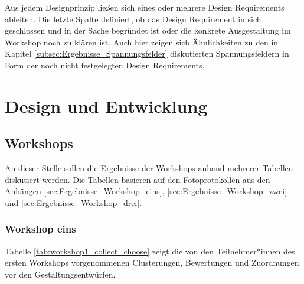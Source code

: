 Aus jedem Designprinzip ließen sich eines oder mehrere Design Requirements ableiten. Die letzte Spalte definiert, ob das Design Requirement in sich geschlossen und in der Sache begründet ist oder die konkrete Ausgestaltung im Workshop noch zu klären ist. Auch hier zeigen sich Ähnlichkeiten zu den in Kapitel \ref{subsec:Ergebnisse_Spannungsfelder} diskutierten Spannungsfeldern in Form der noch nicht festgelegten Design Requirements. 

\section{Design und Entwicklung}
\label{sec:Ergebnisse_Phase_drei}

\subsection{Workshops}
\label{subsec:Ergebnisse_Workshops}

An dieser Stelle sollen die Ergebnisse der Workshops anhand mehrerer Tabellen diskutiert werden. Die Tabellen basieren auf den Fotoprotokollen aus den Anhängen \ref{sec:Ergebnisse_Workshop_eins}, \ref{sec:Ergebnisse_Workshop_zwei} und \ref{sec:Ergebnisse_Workshop_drei}.

\subsubsection{Workshop eins}
\label{subsubsec:Ergebnisse_Workshop_eins}

Tabelle \ref{tab:workshop1_collect_choose} zeigt die von den Teilnehmer*innen des ersten Workshops vorgenommenen Clusterungen, Bewertungen und Zuordnungen vor den Gestaltungsentwürfen.

